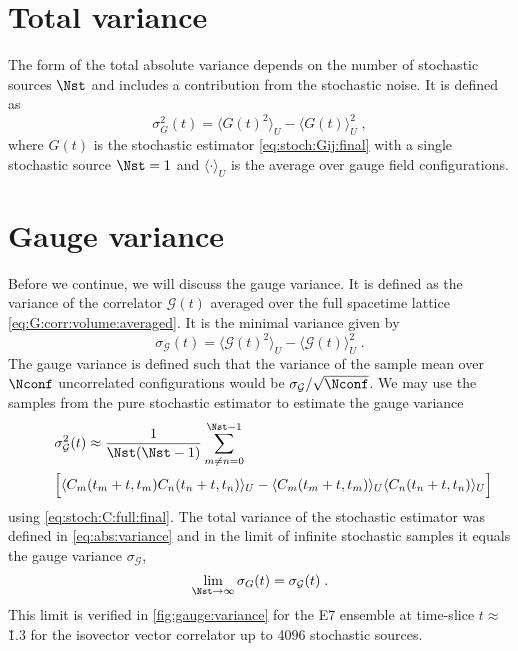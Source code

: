 \section{Total variance}

The form of the total absolute variance depends on the number of stochastic sources $\Nst$ and includes a contribution from the stochastic noise.
It is defined as
\begin{equation} \label{eq:abs:variance}
\sigma_{G}^{2}(t) = \langle G(t)^{2} \rangle_{U} - \langle G(t) \rangle_{U}^{2} \;,
\end{equation}
where $G(t)$ is the stochastic estimator \cref{eq:stoch:Gij:final} with a single stochastic source $\Nst=1$ and $\langle \cdot \rangle_U$ is the average over gauge field configurations.

\section{Gauge variance}
\label{sec:numerics:gauge:variance}

Before we continue, we will discuss the gauge variance.
It is defined as the variance of the correlator $\mathcal{G}(t)$ averaged over the full spacetime lattice \cref{eq:G:corr:volume:averaged}.
It is the minimal variance given by
\begin{equation} \label{eq:var:gauge}
\sigma_{\mathcal{G}}(t) = \langle \mathcal{G}(t)^{2} \rangle_{U} - \langle \mathcal{G}(t) \rangle_{U}^{2} \;.
\end{equation}
The gauge variance is defined such that the variance of the sample mean over $\Nconf$ uncorrelated configurations would be $\sigma_{\mathcal{G}}/\sqrt{\Nconf}$.
We may use the samples from the pure stochastic estimator to estimate the gauge variance
\begin{align}
\nonumber
&\sigma^{2}_{\mathcal{G}}(t) \approx
\frac{1}{\Nst(\Nst-1)} \sum_{m \neq n=0}^{\Nst-1}\\
\label{eq:appendix:gv:formula}
\qquad&\Big[ \langle C_m(t_m+t, t_m) C_n(t_n+t, t_n) \rangle_{U}
- \langle C_m(t_m+t,t_m) \rangle_{U} \langle C_n(t_n+t,t_n) \rangle_{U} \Big]
\end{align}
using \cref{eq:stoch:C:full:final}.
The total variance of the stochastic estimator was defined in \cref{eq:abs:variance} and in the limit of infinite stochastic samples it equals the gauge variance $\sigma_{\mathcal{G}}$,
\begin{equation} \label{eq:var:gauge:limit}
\lim_{\Nst \to \infty} \sigma_{G}(t) = \sigma_{\mathcal{G}}(t) \;.
\end{equation}
This limit is verified in \cref{fig:gauge:variance} for the E7 ensemble at time-slice $t \approx $ \u{1.3}{\femto \metre} for the isovector vector correlator up to \num{4096} stochastic sources.

